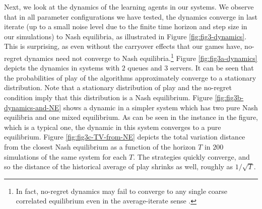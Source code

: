 Next, we look at the dynamics of the learning agents in our systems. We observe that in all parameter configurations we have tested, the dynamics converge in last iterate (up to a small noise level due to the finite time horizon and step size in our simulations) to Nash equilibria, as illustrated in Figure \ref{fig:fig3-dynamics}.  This is surprising, as even without the carryover effects that our games have, no-regret dynamics need not converge to Nash equilibria.\footnote{In fact, no-regret dynamics may fail to converge to any single coarse correlated equilibrium even in the average-iterate sense \cite{kolumbus2022auctions,kolumbus2022and}.}
Figure \ref{fig:fig3a-dynamics} depicts the dynamics in systems with $2$ queues and $3$ servers. It can be seen that the probabilities of play of the algorithms approximately converge to a stationary distribution. Note that a stationary distribution of play and the no-regret condition imply that this distribution is a Nash equilibrium. 
Figure \ref{fig:fig3b-dynamics-and-NE} shows a dynamic in a simpler system which has two pure Nash equilibria and one mixed equilibrium. As can be seen in the instance in the figure, which is a typical one, the dynamic in this system converges to a pure equilibrium. 
Figure \ref{fig:fig3c-TV-from-NE} depicts the total variation distance from the closest Nash equilibrium as a function of the horizon $T$ in $200$ simulations of the same system for each $T$. The strategies quickly converge, and so the distance of the historical average of play shrinks as well, roughly as $1/\sqrt{T}$.

